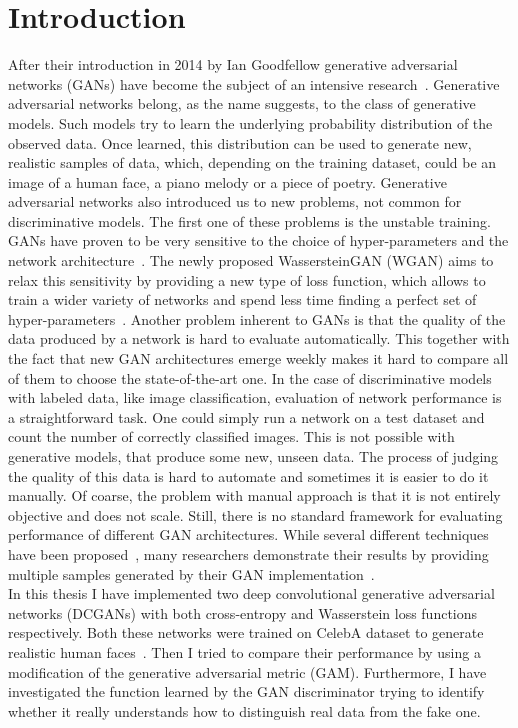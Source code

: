 \section{Introduction}
After their introduction in 2014 by Ian Goodfellow generative adversarial networks (GANs) have become the subject of an intensive research~\cite{gan}. Generative adversarial networks belong, as the name suggests, to the class of generative models. Such models try to learn the underlying probability distribution of the observed data. Once learned, this distribution can be used to generate new, realistic samples of data, which, depending on the training dataset, could be an image of a human face, a piano melody or a piece of poetry. Generative adversarial networks also introduced us to new problems, not common for discriminative models. The first one of these problems is the unstable training. GANs have proven to be very sensitive to the choice of hyper-parameters and the network architecture~\cite{wgan}. The newly proposed WassersteinGAN (WGAN) aims to relax this sensitivity by providing a new type of loss function, which allows to train a wider variety of networks and spend less time finding a perfect set of hyper-parameters~\cite{wgan}. Another problem inherent to GANs is that the quality of the data produced by a network is hard to evaluate automatically. This together with the fact that new GAN architectures emerge weekly makes it hard to compare all of them to choose the state-of-the-art one. In the case of discriminative models with labeled data, like image classification, evaluation of network performance is a straightforward task. One could simply run a network on a test dataset and count the number of correctly classified images. This is not possible with generative models, that produce some new, unseen data. The process of judging the quality of this data is hard to automate and sometimes it is easier to do it manually. Of coarse, the problem with manual approach is that it is not entirely objective and does not scale. Still, there is no standard framework for evaluating performance of different GAN architectures. While several different techniques have been proposed~\cite{gam, inception}, many researchers demonstrate their results by providing multiple samples generated by their GAN implementation~\cite{dcgan}. \\ 
\indent In this thesis I have implemented two deep convolutional generative adversarial networks (DCGANs) with both cross-entropy and Wasserstein loss functions respectively. Both these networks were trained on CelebA dataset to generate realistic human faces~\cite{celeba}. Then I tried to compare their performance by using a modification of the generative adversarial metric (GAM). Furthermore, I have investigated the function learned by the GAN discriminator trying to identify whether it really understands how to distinguish real data from the fake one. 